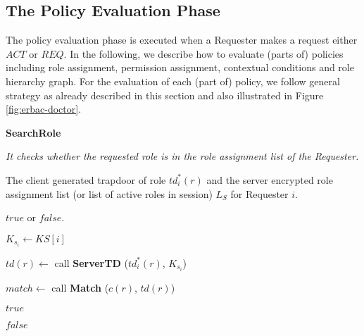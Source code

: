 \documentclass[epsfig,a4paper,11pt,titlepage]{book}
\numberwithin{algorithm}{chapter}
\newcommand{\algofontsize}{\fontsize{11}{12}\selectfont}
\begin{document}
\subsection{The Policy Evaluation Phase}

The policy evaluation phase is executed when a Requester makes a request either $\mathit{ACT}$ or $\mathit{REQ}$. In the following, we describe how to evaluate (parts of) policies including role assignment, permission assignment, contextual conditions and role hierarchy graph. For the evaluation of each (part of) policy, we follow general strategy as already described in this section and also illustrated in Figure \ref{fig:erbac-doctor}.




\begin{algorithm} [htp]
{\algofontsize
\caption{\textbf{SearchRole}}

\label{algo:erbac-search-role}

\begin{algorithmic}[1]

\INPUT \emph{It checks whether the requested role is in the role assignment list of the Requester.}

\Require The client generated trapdoor of role $td^*_i (r)$ and the server encrypted role assignment list (or list of active roles in session) $L_{S}$ for Requester $i$.

\Ensure $\mathit{true}$ or $\mathit{false}$.

\medskip

\State $K_{s_i} \leftarrow KS[i]$ {\algofontsize {}} \label{line:erbac-search-role-ks}

\State $td(r) \leftarrow$ call \textbf{ServerTD} ($td^*_i (r)$, $K_{s_i}$) \label{line:erbac-search-role-td}

 \label{line:erbac-search-role-loop}

	\State $match \leftarrow$ call \textbf{Match} ($c(r)$, $td(r)$) {\algofontsize {}} \label{line:erbac-search-role-call}

	 \label{line:erbac-search-role-match}
	
		\Return $\mathit{true}$ \label{line:erbac-search-role-true}
		
	\EndIf

\EndFor

\Return $\mathit{false}$ \label{line:erbac-search-role-false}

\end{algorithmic}
}
\end{algorithm}
\end{document}
